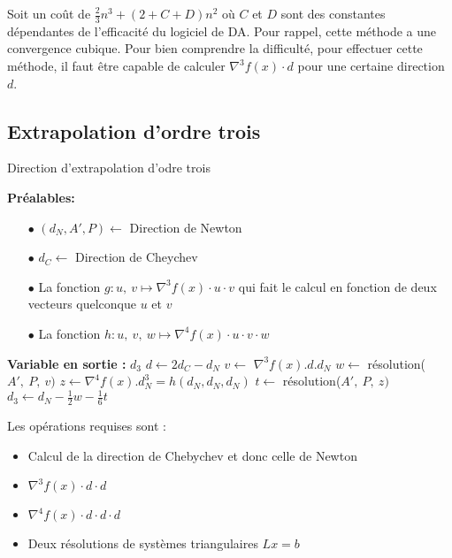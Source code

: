Soit un coût de $\frac{2}{3}n^3+(2+C+D)n^2$ o\`u $C$ et $D$ sont des constantes d\'ependantes de l'efficacit\'e du logiciel de DA.
Pour rappel, cette m\'ethode a une convergence cubique.
Pour bien comprendre la difficult\'e, pour effectuer cette m\'ethode, il faut être capable de calculer $\nabla^3 f(x)\cdot d$ pour une
certaine direction $d$.




\subsection{Extrapolation d'ordre trois}


\begin{algorithm}                     %
\caption{Direction d'extrapolation d'odre trois}          %
\label{alg:3}                           %
\begin{algorithmic}
\STATE \textbf{Pr\'ealables:} %
\begin{itemize}
\item[$\bullet$] $(d_N,A',P)\leftarrow$ Direction de Newton
\item[$\bullet$] $d_C \leftarrow$ Direction de Cheychev
\item[$\bullet$] La fonction $g: u,\ v \mapsto \nabla^3 f(x)\cdot u\cdot v$ qui fait le calcul en fonction
de deux vecteurs quelconque $u$ et $v$
\item[$\bullet$] La fonction $h: u,\ v,\ w \mapsto \nabla^4 f(x)\cdot u\cdot v\cdot w$
\end{itemize}
\STATE \textbf{Variable en sortie :} $d_3$
\STATE $d \leftarrow 2d_C-d_N$
\STATE $v \leftarrow$ $\nabla^3 f(x).d.d_N$
\STATE $w\leftarrow$ r\'esolution($A',\ P,\ v)$
\STATE $z\leftarrow\nabla^4 f(x).d_N^3=h(d_N,d_N,d_N)$
\STATE $t\leftarrow$ r\'esolution($A',\ P,\ z)$
\STATE $d_3 \leftarrow d_N-\frac{1}{2}w-\frac{1}{6}t$
\end{algorithmic}
\end{algorithm}


Les op\'erations requises sont :

\begin{itemize}
\item Calcul de la direction de Chebychev et donc celle de Newton
\item $\nabla^3 f(x)\cdot d\cdot d$
\item $\nabla^4 f(x)\cdot d\cdot d\cdot d$
\item Deux r\'esolutions de syst\`emes triangulaires $Lx=b$
\end{itemize}

